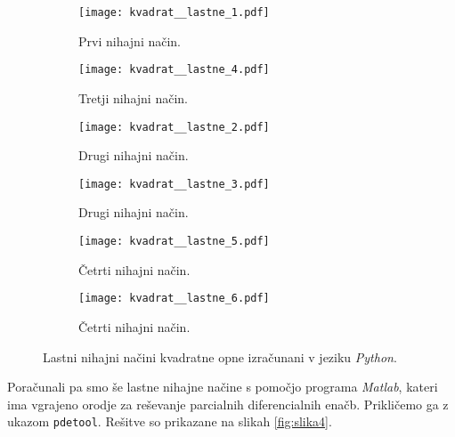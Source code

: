 \documentclass[12pt,a4paper]{article}
\begin{document}
\begin{figure}[H]
    \centering
    \begin{subfigure}[b]{0.45\textwidth}  			
        \texttt{[image: kvadrat\_\_lastne\_1.pdf]}
        \caption{Prvi nihajni način.}
    \end{subfigure}
    \begin{subfigure}[b]{0.45\textwidth}  			
        \texttt{[image: kvadrat\_\_lastne\_4.pdf]}
        \caption{Tretji nihajni način.}
    \end{subfigure}
    
    \begin{subfigure}[b]{0.45\textwidth}  			
        \texttt{[image: kvadrat\_\_lastne\_2.pdf]}
        \caption{Drugi nihajni način.}
    \end{subfigure}
    \begin{subfigure}[b]{0.45\textwidth}  			
        \texttt{[image: kvadrat\_\_lastne\_3.pdf]}
        \caption{Drugi nihajni način.}
    \end{subfigure}
    
    \begin{subfigure}[b]{0.45\textwidth}  			
        \texttt{[image: kvadrat\_\_lastne\_5.pdf]}
        \caption{Četrti nihajni način.}
    \end{subfigure}
    \begin{subfigure}[b]{0.45\textwidth}  			
        \texttt{[image: kvadrat\_\_lastne\_6.pdf]}
        \caption{Četrti nihajni način.}
    \end{subfigure}
    \caption{Lastni nihajni načini kvadratne opne izračunani v jeziku \textit{Python}.} \label{fig:slika3}
\end{figure}

\noindent Poračunali pa smo še lastne nihajne načine s pomočjo programa \textit{Matlab}, kateri ima vgrajeno orodje za reševanje parcialnih diferencialnih enačb. Prikličemo ga z ukazom \texttt{pdetool}. Rešitve so prikazane na slikah \ref{fig:slika4}.
\end{document}
